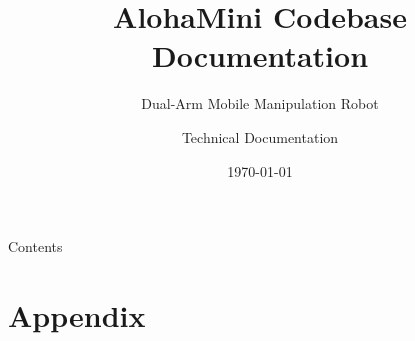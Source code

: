 \documentclass[aspectratio=169]{beamer}
\title[AlohaMini]{AlohaMini Codebase Documentation}
\subtitle{Dual-Arm Mobile Manipulation Robot}
\author{Technical Documentation}
\date{\today}
\institute{ManiSkill3 Integration}
\begin{document}
\begin{frame}
    \titlepage
\end{frame}

\begin{frame}{Contents}
    \tableofcontents
\end{frame}














\appendix

\section{Appendix}
\end{document}

